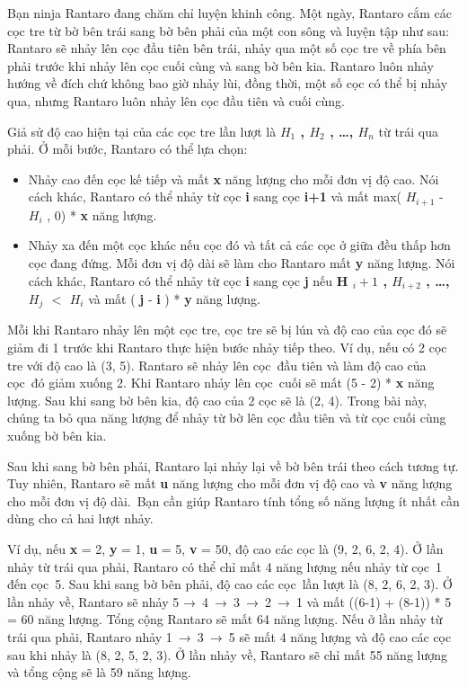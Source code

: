 Bạn ninja   Rantaro   đang chăm chỉ luyện khinh công. Một ngày,   Rantaro   cắm các cọc tre từ bờ bên trái sang bờ bên phải của một con sông và luyện tập như sau:   Rantaro   sẽ nhảy lên cọc đầu tiên bên trái, nhảy qua một số cọc tre về phía bên phải trước khi nhảy lên cọc cuối cùng và sang bờ bên kia.   Rantaro   luôn nhảy hướng về đích chứ không bao giờ nhảy lùi, đồng thời, một số cọc có thể bị nhảy qua, nhưng   Rantaro   luôn nhảy lên cọc đầu tiên và cuối cùng.  

   Giả sử độ cao hiện tại của các cọc tre lần lượt là   \textbf{    $H_{1}$    , $H_{2}$    , …, $H_{n}$}   từ trái qua phải. Ở mỗi bước,   Rantaro   có thể lựa chọn:  
\begin{itemize}
	\item     Nhảy cao đến cọc kế tiếp và mất    \textbf{     x    }    năng lượng cho mỗi đơn vị độ cao. Nói cách khác,    Rantaro    có thể nhảy từ cọc    \textbf{     i    }    sang cọc    \textbf{     i+1    }    và mất max(    \textbf{     $H_{i+1}$}    -    \textbf{     $H_{i}$}    , 0) *    \textbf{     x    }    năng lượng.   
	\item     Nhảy xa đến một cọc khác nếu cọc đó và tất cả các cọc ở giữa đều thấp hơn cọc đang đứng. Mỗi đơn vị độ dài sẽ làm cho    Rantaro    mất    \textbf{     y    }    năng lượng. Nói cách khác,    Rantaro    có thể nhảy từ cọc    \textbf{     i    }    sang cọc    \textbf{     j    }    nếu    \textbf{     H     \textbf{$_       i+1      $}     , $H_{i+2}$     , …, $H_{j}$     $<$ $H_{i}$}    và mất (    \textbf{     j    }    -    \textbf{     i    }    ) *    \textbf{     y    }    năng lượng.   
\end{itemize}

   Mỗi khi   Rantaro   nhảy lên một cọc tre, cọc tre sẽ bị lún và độ cao của cọc đó sẽ giảm đi 1 trước khi   Rantaro   thực hiện bước nhảy tiếp theo. Ví dụ, nếu có 2 cọc tre với độ cao là (3, 5).   Rantaro   sẽ nhảy lên cọc đầu tiên và làm độ cao của cọc đó giảm xuống 2. Khi   Rantaro   nhảy lên cọc cuối sẽ mất (5 - 2) *   \textbf{    x   }   năng lượng. Sau khi sang bờ bên kia, độ cao của 2 cọc sẽ là (2, 4). Trong bài này, chúng ta bỏ qua năng lượng để nhảy từ bờ lên cọc đầu tiên và từ cọc cuối cùng xuống bờ bên kia.  

   Sau khi sang bờ bên phải,   Rantaro   lại nhảy lại về bờ bên trái theo cách tương tự. Tuy nhiên,   Rantaro   sẽ mất   \textbf{    u   }   năng lượng cho mỗi đơn vị độ cao và   \textbf{    v   }   năng lượng cho mỗi đơn vị độ dài. Bạn cần giúp Rantaro tính tổng số năng lượng ít nhất cần dùng cho cả hai lượt nhảy.  

   Ví dụ, nếu   \textbf{    x   }   = 2,   \textbf{    y   }   = 1,   \textbf{    u   }   = 5,   \textbf{    v   }   = 50, độ cao các cọc là (9, 2, 6, 2, 4). Ở lần nhảy từ trái qua phải,   Rantaro   có thể chỉ mất 4 năng lượng nếu nhảy từ cọc 1 đến cọc 5. Sau khi sang bờ bên phải, độ cao các cọc lần lượt là (8, 2, 6, 2, 3). Ở lần nhảy về,   Rantaro   sẽ nhảy 5 → 4 → 3 → 2 → 1 và mất ((6-1) + (8-1)) * 5 = 60 năng lượng. Tổng cộng   Rantaro   sẽ mất 64 năng lượng. Nếu ở lần nhảy từ trái qua phải,   Rantaro   nhảy 1 → 3 → 5 sẽ mất 4 năng lượng và độ cao các cọc sau khi nhảy là (8, 2, 5, 2, 3). Ở lần nhảy về,   Rantaro   sẽ chỉ mất 55 năng lượng và tổng cộng sẽ là 59 năng lượng.